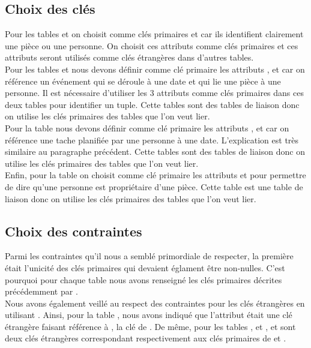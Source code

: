 \subsection{Choix des clés}
Pour les tables \textbf{} et \textbf{} on choisit comme clés primaires  et  car ils identifient clairement une pièce ou une personne. On choisit ces attributs comme clés primaires et ces attributs seront utilisés comme clés étrangères dans d'autres tables.\\

Pour les tables \textbf{} et \textbf{} nous devons définir comme clé primaire les attributs ,  et  car on référence un événement qui se déroule à une date et qui lie une pièce à une personne. Il est nécessaire d'utiliser les 3 attributs comme clés primaires dans ces deux tables pour identifier un tuple. Cette tables sont des tables de liaison donc on utilise les clés primaires des tables que l'on veut lier.\\

Pour la table \textbf{}  nous devons définir comme clé primaire les attributs ,  et  car on référence une tache planifiée par une personne à une date. L'explication est très similaire au paragraphe précédent. Cette tables sont des tables de liaison donc on utilise les clés primaires des tables que l'on veut lier.\\

Enfin, pour la table \textbf{} on choisit comme clé primaire les attributs  et  pour permettre de dire qu'une personne est propriétaire d'une pièce. Cette table est une table de liaison donc on utilise les clés primaires des tables que l'on veut lier.


\subsection{Choix des contraintes}
Parmi les contraintes qu'il nous a semblé primordiale de respecter, la première était l'unicité des clés primaires qui devaient églament être non-nulles. C'est pourquoi pour chaque table nous avons renseigné les clés primaires décrites précédemment par .\\

Nous avons également veillé au respect des contraintes pour les clés étrangères en utilisant . Ainsi, pour la table , nous avons indiqué que l'attribut  était une clé étrangère faisant référence à , la clé de . De même, pour les tables ,  et ,  et  sont deux clés étrangères correspondant respectivement aux clés primaires de  et .\\

